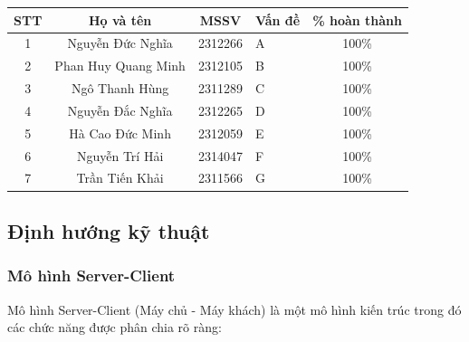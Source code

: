 \documentclass[a4paper, 15pt]{article}
\begin{document}

\begin{center}
\begin{table}[H]
\centering
\begin{tabularx}{\textwidth}{|c|c|c|X|c|}
\hline
\textbf{STT} & \textbf{Họ và tên} & \textbf{MSSV} & \textbf{Vấn đề} & \textbf{\% hoàn thành}\\
\hline 
\multirow{1}{*}{1} & \multirow{1}{*}{Nguyễn Đức Nghĩa} & \multirow{1}{*}{2312266} & A 
 & \multirow{1}{*}{100\%}\\
\hline 
\multirow{1}{*}{2} & \multirow{1}{*}{Phan Huy Quang Minh} & \multirow{1}{*}{2312105} & 
B & \multirow{1}{*}{100\%}\\

\hline
\multirow{1}{*}{3} & \multirow{1}{*}{Ngô Thanh Hùng} & \multirow{1}{*}{2311289} & 
C & \multirow{1}{*}{100\%}\\

\hline
\multirow{1}{*}{4} & \multirow{1}{*}{Nguyễn Đắc Nghĩa} & \multirow{1}{*}{2312265} & 
D & \multirow{1}{*}{100\%}\\
\hline
\multirow{1}{*}{5} & \multirow{1}{*}{Hà Cao Đức Minh} & \multirow{1}{*}{2312059} & 
E & \multirow{1}{*}{100\%}\\
\hline
\multirow{1}{*}{6} & \multirow{1}{*}{Nguyễn Trí Hải} & \multirow{1}{*}{2314047} & 
F & \multirow{1}{*}{100\%}\\
\hline
\multirow{1}{*}{7} & \multirow{1}{*}{Trần Tiến Khải} & \multirow{1}{*}{2311566} & 
G & \multirow{1}{*}{100\%}\\
\hline
\end{tabularx}
\end{table}
\end{center}

\newpage








\subsection{Định hướng kỹ thuật}
\subsubsection{Mô hình Server-Client}
Mô hình Server-Client (Máy chủ - Máy khách) là một mô hình kiến trúc trong đó các chức năng được phân chia rõ ràng:
\end{document}
